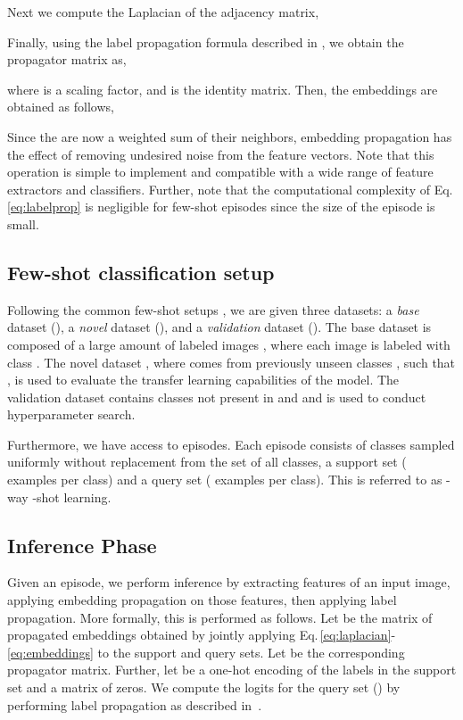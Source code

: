 \documentclass[runningheads]{llncs}
\begin{document}
Next we compute  the Laplacian of the adjacency matrix, 


Finally, using the label propagation formula described in \cite{DBLP:conf/nips/ZhouBLWS03}, we obtain the propagator matrix  as,

where  is a scaling factor, and  is the identity matrix. Then, the embeddings are obtained as follows,

Since the  are now a weighted sum of their neighbors, embedding propagation has the effect of removing undesired noise from the feature vectors.
Note that this operation is simple to implement and compatible with a wide range of feature extractors and classifiers. Further, note that the computational complexity of Eq. \ref{eq:labelprop} is negligible for few-shot episodes \cite{liu2018learning} since the size of the episode is small. 

 
\subsection{Few-shot classification setup}
Following the common few-shot setups \cite{vinyals2016matching,ren2018metalearning}, we are given three datasets: a \emph{base} dataset (), a \emph{novel} dataset (), and a \emph{validation} dataset (). The base dataset is composed of a large amount of labeled images , where each image  is labeled with class . The novel dataset , where  comes from previously unseen classes , such that , is used to evaluate the transfer learning capabilities of the model. The validation dataset  contains classes not present in  and  and is used to conduct hyperparameter search. 

Furthermore, we have access to episodes. Each episode consists of  classes sampled uniformly without replacement from the set of all classes, a support set  ( examples per class) and a query set  ( examples per class). This is referred to as  -way -shot learning.

\subsection{Inference Phase}
\label{sec:inference}
Given an episode, we perform inference by extracting features of an input image, applying embedding propagation on those features,  then applying label propagation. 
More formally, this is performed as follows. Let  be the matrix of propagated embeddings obtained by jointly applying Eq.\,\ref{eq:laplacian}-\ref{eq:embeddings} to the support and query sets.
Let  be the corresponding propagator matrix.
Further, let  be a one-hot encoding of the labels in the support set and  a matrix of zeros. We compute the logits for the query set () by performing label propagation as described in~\cite{DBLP:conf/nips/ZhouBLWS03}.
\end{document}
